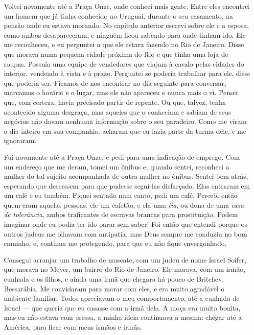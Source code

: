 
Voltei novamente até a Praça Onze, onde conheci mais gente. Entre
eles encontrei um homem que já tinha conhecido no Uruguai, durante o seu
casamento, na pensão onde eu estava morando. No capítulo anterior 
escrevi sobre ele e a esposa, como ambos desapareceram, e ninguém
ficou sabendo para onde tinham ido. Ele me reconheceu, e eu perguntei o
que ele estava fazendo no Rio de Janeiro. Disse que morava numa
pequena cidade próxima do Rio e que tinha uma loja de roupas. Possuía uma 
equipe de vendedores que viajam à cavalo pelas cidades do
interior, vendendo à vista e à prazo. Perguntei se poderia trabalhar para
ele, disse que poderia ser. Ficamos de nos encontrar no dia seguinte
para conversar, marcamos o horário e o lugar, mas ele não apareceu e
nunca mais o vi. Pensei que, com certeza, havia precisado partir de
repente. Ou que, talvez, tenha acontecido alguma desgraça, mas
aqueles que o conheciam e sabiam de seus negócios não davam nenhuma
informação sobre o seu paradeiro. Como me viram o dia inteiro em sua
companhia, acharam que eu fazia parte da turma dele, e me ignoraram.

Fui novamente até a Praça Onze, e pedi para uma indicação de
emprego. Com um endereço que me deram, tomei um ônibus e, quando
sentei, reconheci a mulher do tal sujeito acompanhada de outra
mulher no ônibus. Sentei bem atrás, esperando que descessem 
para que pudesse seguí-las disfarçado. Elas entraram em um café
e eu também. Fiquei sentado num canto, pedi um café. Percebi então
quem eram aquelas pessoas: ele um cafetão, e ela uma \textit{tia}, ou dona de uma \textit{casa de tolerância}, ambos traficantes de escravas
brancas para prostituição. Podem imaginar onde eu podia ter ido parar 
sem saber! Foi então que entendi porque os outros judeus me olhavam com
antipatia, mas Deus sempre me conduziu no bom caminho, e, continua me
protegendo, para que eu não fique envergonhado.

Consegui arranjar um trabalho de mascate, com um judeu de nome Israel
Soifer, que morava no Meyer, um bairro do Rio de Janeiro. Ele morava,
com um irmão, cunhada e os filhos, e ainda uma irmã que chegara há pouco
de Britchev, Bessarábia. Me convidaram para morar com eles, e era muito
agradável o ambiente familiar. Todos apreciavam o meu comportamento,
até a cunhada de Israel --- que queria que eu casasse com a irmã dela. A moça
era muito bonita, mas eu não estava com pressa, a minha ideia continuava
a mesma: chegar até a América, para ficar com meus irmãos e irmãs.

